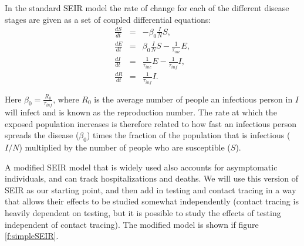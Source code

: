 \documentclass[notitlepage, superscriptaddress]{revtex4-2}
\begin{document}
In the standard SEIR model the rate of change for each of the different disease stages are given as a set of coupled differential equations:
\begin{eqnarray}
\label{E:SEIR}
\frac{dS}{dt} &=& - \beta_0 \frac{I}{N}S, \\
\frac{dE}{dt} &=& \beta_0 \frac{I}{N}S - \frac{1}{\tau_{inc}}E, \\ 
\frac{dI}{dt} &=& \frac{1}{\tau_{inc}}E - \frac{1}{\tau_{inf}}I, \\ 
\frac{dR}{dt} &=& \frac{1}{\tau_{inf}}I.
\end{eqnarray}

Here $\beta_0 = \frac{R_{0}}{\tau_{inf}}$, where $R_{0}$ is the average number of people an infectious person in $I$ will infect and is known as the reproduction number. The rate at which the exposed population increases is therefore related to how fast an infectious person spreads the disease ($\beta_{0}$) times the fraction of the population that is infectious ($I/N$) multiplied by the number of people who are susceptible ($S$).

A modified SEIR model that is widely used also accounts for asymptomatic individuals, and can track hospitalizations and deaths. We will use this version of SEIR as our starting point, and then add in testing and contact tracing in a way that allows their effects to be studied somewhat independently (contact tracing is heavily dependent on testing, but it is possible to study the effects of testing independent of contact tracing). The modified model is shown if figure \ref{f:simpleSEIR}.
\end{document}

